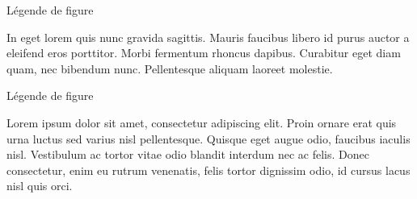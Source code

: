 ﻿\documentclass[year=2013]{jres}
\begin{document}
Légende de figure

In eget lorem quis nunc gravida sagittis. Mauris faucibus libero id purus auctor a eleifend eros porttitor. Morbi fermentum rhoncus dapibus. Curabitur eget diam quam, nec bibendum nunc. Pellentesque aliquam laoreet molestie. 

Légende de figure

Lorem ipsum dolor sit amet, consectetur adipiscing elit. Proin ornare erat quis urna luctus sed varius nisl pellentesque. Quisque eget augue odio, faucibus iaculis nisl. Vestibulum ac tortor vitae odio blandit interdum nec ac felis. Donec consectetur, enim eu rutrum venenatis, felis tortor dignissim odio, id cursus lacus nisl quis orci.


\nocite{*}

\end{document}

